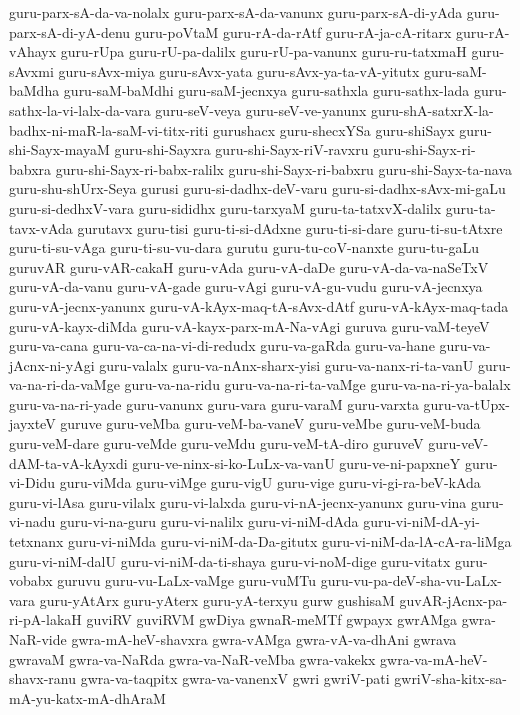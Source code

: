 {guru-parx-sA-da-va-nolalx
guru-parx-sA-da-vanunx
guru-parx-sA-di-yAda
guru-parx-sA-di-yA-denu
guru-poVtaM
guru-rA-da-rAtf
guru-rA-ja-cA-ritarx
guru-rA-vAhayx
guru-rUpa
guru-rU-pa-dalilx
guru-rU-pa-vanunx
guru-ru-tatxmaH
guru-sAvxmi
guru-sAvx-miya
guru-sAvx-yata
guru-sAvx-ya-ta-vA-yitutx
guru-saM-baMdha
guru-saM-baMdhi
guru-saM-jecnxya
guru-sathxla
guru-sathx-lada
guru-sathx-la-vi-lalx-da-vara
guru-seV-veya
guru-seV-ve-yanunx
guru-shA-satxrX-la-badhx-ni-maR-la-saM-vi-titx-riti
gurushacx
guru-shecxYSa
guru-shiSayx
guru-shi-Sayx-mayaM
guru-shi-Sayxra
guru-shi-Sayx-riV-ravxru
guru-shi-Sayx-ri-babxra
guru-shi-Sayx-ri-babx-ralilx
guru-shi-Sayx-ri-babxru
guru-shi-Sayx-ta-nava
guru-shu-shUrx-Seya
gurusi
guru-si-dadhx-deV-varu
guru-si-dadhx-sAvx-mi-gaLu
guru-si-dedhxV-vara
guru-sididhx
guru-tarxyaM
guru-ta-tatxvX-dalilx
guru-ta-tavx-vAda
gurutavx
guru-tisi
guru-ti-si-dAdxne
guru-ti-si-dare
guru-ti-su-tAtxre
guru-ti-su-vAga
guru-ti-su-vu-dara
gurutu
guru-tu-coV-nanxte
guru-tu-gaLu
guruvAR
guru-vAR-cakaH
guru-vAda
guru-vA-daDe
guru-vA-da-va-naSeTxV
guru-vA-da-vanu
guru-vA-gade
guru-vAgi
guru-vA-gu-vudu
guru-vA-jecnxya
guru-vA-jecnx-yanunx
guru-vA-kAyx-maq-tA-sAvx-dAtf
guru-vA-kAyx-maq-tada
guru-vA-kayx-diMda
guru-vA-kayx-parx-mA-Na-vAgi
guruva
guru-vaM-teyeV
guru-va-cana
guru-va-ca-na-vi-di-redudx
guru-va-gaRda
guru-va-hane
guru-va-jAcnx-ni-yAgi
guru-valalx
guru-va-nAnx-sharx-yisi
guru-va-nanx-ri-ta-vanU
guru-va-na-ri-da-vaMge
guru-va-na-ridu
guru-va-na-ri-ta-vaMge
guru-va-na-ri-ya-balalx
guru-va-na-ri-yade
guru-vanunx
guru-vara
guru-varaM
guru-varxta
guru-va-tUpx-jayxteV
guruve
guru-veMba
guru-veM-ba-vaneV
guru-veMbe
guru-veM-buda
guru-veM-dare
guru-veMde
guru-veMdu
guru-veM-tA-diro
guruveV
guru-veV-dAM-ta-vA-kAyxdi
guru-ve-ninx-si-ko-LuLx-va-vanU
guru-ve-ni-papxneY
guru-vi-Didu
guru-viMda
guru-viMge
guru-vigU
guru-vige
guru-vi-gi-ra-beV-kAda
guru-vi-lAsa
guru-vilalx
guru-vi-lalxda
guru-vi-nA-jecnx-yanunx
guru-vina
guru-vi-nadu
guru-vi-na-guru
guru-vi-nalilx
guru-vi-niM-dAda
guru-vi-niM-dA-yi-tetxnanx
guru-vi-niMda
guru-vi-niM-da-Da-gitutx
guru-vi-niM-da-lA-cA-ra-liMga
guru-vi-niM-dalU
guru-vi-niM-da-ti-shaya
guru-vi-noM-dige
guru-vitatx
guru-vobabx
guruvu
guru-vu-LaLx-vaMge
guru-vuMTu
guru-vu-pa-deV-sha-vu-LaLx-vara
guru-yAtArx
guru-yAterx
guru-yA-terxyu
gurw
gushisaM
guvAR-jAcnx-pa-ri-pA-lakaH
guviRV
guviRVM
gwDiya
gwnaR-meMTf
gwpayx
gwrAMga
gwra-NaR-vide
gwra-mA-heV-shavxra
gwra-vAMga
gwra-vA-va-dhAni
gwrava
gwravaM
gwra-va-NaRda
gwra-va-NaR-veMba
gwra-vakekx
gwra-va-mA-heV-shavx-ranu
gwra-va-taqpitx
gwra-va-vanenxV
gwri
gwriV-pati
gwriV-sha-kitx-sa-mA-yu-katx-mA-dhAraM
}
